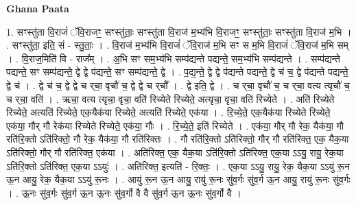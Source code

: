 \documentclass[17pt]{extarticle}
\begin{document}
\textbf{Ghana Paata } \newline

1. सꣳस्तु॑ता वि॒राजं॑ ॅवि॒राजꣳ॒॒ सꣳस्तु॑ताः॒ सꣳस्तु॑ता वि॒राज॑ म॒भ्य॑भि वि॒राजꣳ॒॒ सꣳस्तु॑ताः॒ सꣳस्तु॑ता वि॒राज॑ म॒भि । . सꣳस्तु॑ता॒ इति॒ सं - स्तु॒ताः॒ । . वि॒राज॑ म॒भ्य॑भि वि॒राजं॑ ॅवि॒राज॑ म॒भि सꣳ स म॒भि वि॒राजं॑ ॅवि॒राज॑ म॒भि सम् । . वि॒राज॒मिति॑ वि - राज᳚म् । . अ॒भि सꣳ सम॒भ्य॑भि सम्प॑द्यन्ते पद्यन्ते॒ सम॒भ्य॑भि सम्प॑द्यन्ते । . सम्प॑द्यन्ते पद्यन्ते॒ सꣳ सम्प॑द्यन्ते॒ द्वे द्वे प॑द्यन्ते॒ सꣳ सम्प॑द्यन्ते॒ द्वे । . प॒द्य॒न्ते॒ द्वे द्वे प॑द्यन्ते पद्यन्ते॒ द्वे च॑ च॒ द्वे प॑द्यन्ते पद्यन्ते॒ द्वे च॑ । . द्वे च॑ च॒ द्वे द्वे च र्‌चा॒ वृचौ॑ च॒ द्वे द्वे च र्‌चौ᳚ । . द्वे इति॒ द्वे । . च र्‌चा॒ वृचौ॑ च॒ च र्‌चा॒ वत्य त्यृचौ॑ च॒ च र्‌चा॒ वति॑ । . ऋचा॒ वत्य त्यृचा॒ वृचा॒ वति॑ रिच्येते रिच्येते॒ अत्यृचा॒ वृचा॒ वति॑ रिच्येते । . अति॑ रिच्येते रिच्येते॒ अत्यति॑ रिच्येते॒ एक॒यैक॑या रिच्येते॒ अत्यति॑ रिच्येते॒ एक॑या । . रि॒च्ये॒ते॒ एक॒यैक॑या रिच्येते रिच्येते॒ एक॑या॒ गौर् गौ रेक॑या रिच्येते रिच्येते॒ एक॑या॒ गौः । . रि॒च्ये॒ते॒ इति॑ रिच्येते । . एक॑या॒ गौर् गौ रेक॒ यैक॑या॒ गौ रति॑रि॒क्तो ऽति॑रिक्तो॒ गौ रेक॒ यैक॑या॒ गौ रति॑रिक्तः । . गौ रति॑रि॒क्तो ऽति॑रिक्तो॒ गौर् गौ रति॑रिक्त॒ एक॒ यैक॒या ऽति॑रिक्तो॒ गौर् गौ रति॑रिक्त॒ एक॑या । . अति॑रिक्त॒ एक॒ यैक॒या ऽति॑रि॒क्तो ऽति॑रिक्त॒ एक॒या ऽऽयु॒ रायु॒ रेक॒या ऽति॑रि॒क्तो ऽति॑रिक्त॒ एक॒या ऽऽयुः॑ । . अति॑रिक्त॒ इत्यति॑ - रि॒क्तः॒ । . एक॒या ऽऽयु॒ रायु॒ रेक॒ यैक॒या ऽऽयु॑ रू॒न ऊ॒न आयु॒ रेक॒ यैक॒या ऽऽयु॑ रू॒नः । . आयु॑ रू॒न ऊ॒न आयु॒ रायु॑ रू॒नः सु॑व॒र्गः सु॑व॒र्ग ऊ॒न आयु॒ रायु॑ रू॒नः सु॑व॒र्गः । . ऊ॒नः सु॑व॒र्गः सु॑व॒र्ग ऊ॒न ऊ॒नः सु॑व॒र्गो वै वै सु॑व॒र्ग ऊ॒न ऊ॒नः सु॑व॒र्गो वै । \newline
\end{document}
